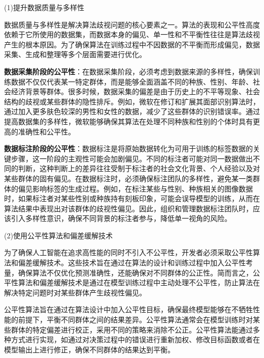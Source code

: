 (1)提升数据质量与多样性

数据质量与多样性是解决算法歧视问题的核心要素之一。算法的表现和公平性高度依赖于它所使用的数据集，而数据本身的偏见、单一性和不平衡性往往是算法歧视产生的根本原因。为了确保算法在训练过程中不因数据的不平衡而形成偏见，数据采集、生成和整理等多个层面需要进行优化。

\textbf{数据采集阶段的公平性}：在数据采集阶段，必须考虑到数据来源的多样性，确保训练数据不仅仅代表某一特定群体，而是能够全面涵盖不同的种族、性别、年龄、社会经济背景等群体。很多时候，数据采集的偏差是由于历史上的不平等现象、社会结构的歧视或某些群体的隐性排斥。例如，微软在修订和扩展其面部识别算法时，通过加入更多肤色较深的男性和女性的数据，减少了这些群体的识别错误率。通过提高数据集的多样性，微软能够确保其算法在处理不同种族和性别的个体时具有更高的准确性和公平性。

\textbf{数据标注阶段的公平性}：数据标注是将原始数据转化为可用于训练的标签数据的关键步骤，这一阶段的主观性可能会加剧偏见。不同的标注者可能对同一数据做出不同的判断，这种判断上的差异往往受制于标注者的社会文化背景、个人经验以及对某些群体的固有偏见。在数据标注时，必须确保标注团队的多样性，避免某一类群体的偏见影响标签的生成过程。例如，在标注某些与性别、种族相关的图像数据时，如果标注者对某些性别或种族持有刻板印象，可能会误导模型的训练，从而在算法结果中表现出对该群体的歧视性偏见。因此，组织和管理数据标注团队时，应该引入多样性意识，确保不同背景的标注者参与，降低单一视角的风险。

(2)使用公平性算法和偏差缓解技术

为了确保人工智能在追求高性能的同时不引入不公平性，开发者必须采取公平性算法和偏差缓解技术。这些技术旨在通过在算法的设计和训练过程中加入公平性考量，确保算法不仅优化预测准确性，还能确保对不同群体的公正性。简而言之，公平性算法和偏差缓解技术是通过在模型训练过程中主动处理不公平性，防止算法在解决特定问题时对某些群体产生歧视性偏见。

公平性算法旨在通过在算法设计中加入公平性目标，确保最终模型能够在不牺牲性能的前提下，平衡不同群体之间的结果差异。公平性算法通常会在模型训练时对某些群体的特定偏差进行校正，采用不同的策略来消除不公正。公平性算法能通过多种方式进行实现，如通过对决策过程中的错误进行重新加权、修改目标函数或者在模型输出上进行修正，确保不同群体的结果达到平衡。

